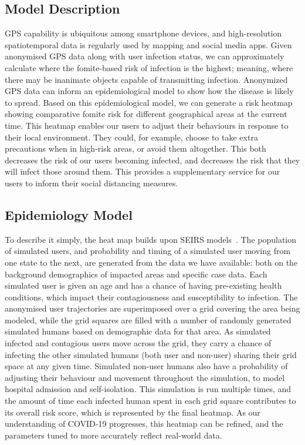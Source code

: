 \documentclass[11pt]{article}
\begin{document}
\subsection{Model Description}

GPS capability is ubiquitous among smartphone devices, and high-resolution spatiotemporal data is regularly used by mapping and social media apps. Given anonymised GPS data along with user infection status, we can approximately calculate where the fomite-based risk of infection is the highest; meaning, where there may be inanimate objects capable of transmitting infection. 
Anonymized GPS data can inform an epidemiological model to show how the disease is likely to spread.
Based on this epidemiological model, we can generate a risk heatmap showing comparative fomite risk for different geographical areas at the current time. This heatmap enables our users to adjust their behaviours in response to their local environment. They could, for example, choose to take extra precautions when in high-risk areas, or avoid them altogether. This both decreases the risk of our users becoming infected, and decreases the risk that they will infect those around them.
This provides a supplementary service for our users to inform their social distancing measures.


\subsection{Epidemiology Model}

To describe it simply, the heat map builds upon SEIRS models~\cite{seirs}. 
The population of simulated users, and probability and timing of a simulated user moving from one state to the next, are generated from the data we have available: both on the background demographics of impacted areas and specific case data. 
Each simulated user is given an age and has a chance of having pre-existing health conditions, which impact their contagiousness and susceptibility to infection.
The anonymised user trajectories are superimposed over a grid covering the area being modeled, while the grid squares are filled with a number of randomly generated simulated humans based on demographic data for that area. As simulated infected and contagious users move across the grid, they carry a chance of infecting the other simulated humans (both user and non-user) sharing their grid space at any given time. 
Simulated non-user humans also have a probability of adjusting their behaviour and movement throughout the simulation, to model hospital admission and self-isolation.
This simulation is run multiple times, and the amount of time each infected human spent in each grid square contributes to its overall risk score, which is represented by the final heatmap.
As our understanding of COVID-19 progresses, this heatmap can be refined, and the parameters tuned to more accurately reflect real-world data.
\end{document}

